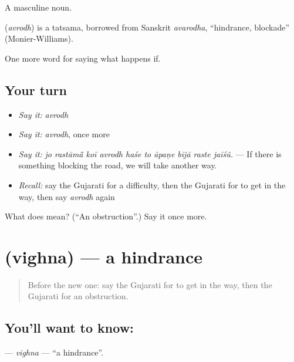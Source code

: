 A masculine noun.

\begin{cousinweb}
\textbf{} (\emph{avrodh}) is a tatsama, borrowed from Sanskrit \emph{avarodha}, \textquotedblleft{}hindrance, blockade\textquotedblright{} (Monier-Williams).
\end{cousinweb}

\begin{grammarlens}[title={What you've built}]
One more word for saying what happens if.
\end{grammarlens}

\subsection*{Your turn}
\begin{itemize}
\raggedright
  \item \emph{Say it:} \emph{avrodh}
  \item \emph{Say it:} \emph{avrodh}, once more
  \item \emph{Say it:} \emph{jo rastāmā̃ koī avrodh haśe to āpaṇe bījā raste jaīśũ.} — If there is something blocking the road, we will take another way.
  \item \emph{Recall:} say the Gujarati for a difficulty, then the Gujarati for to get in the way, then say \emph{avrodh} again
\end{itemize}

\begin{tcolorbox}[breakable,colback=teal!4,colframe=teal!35!black,title={Before you move on}]
What does  mean? (\textquotedblleft{}An obstruction\textquotedblright{}.) Say it once more.
\end{tcolorbox}
\section[\texorpdfstring{\gu{વિઘ્ન} (vighna)}{વિઘ્ન (vighna)}]{ (vighna) — a hindrance}

\label{lesson:GU-C374-vighna}



\begin{quote}
Before the new one: say the Gujarati for to get in the way, then the Gujarati for an obstruction.
\end{quote}

\subsection*{You'll want to know: }
\textbf{} — \emph{vighna} — \textquotedblleft{}a hindrance\textquotedblright{}.

